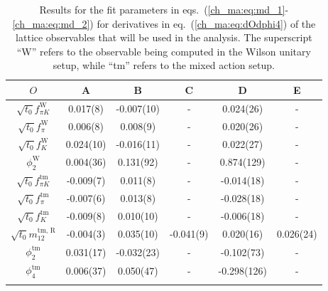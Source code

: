 \begin{longtable}{c | c c c c c}
\label{ch_ma:tab:md}
    ${O}$ & A & B & C & D & E \\
    \toprule
    $\sqrt{t_0}f_{\pi K}^{\textrm{W}}$ & 0.017(8) & -0.007(10) & - & 0.024(26) & - \\ 
    $\sqrt{t_0}f_{\pi}^{\textrm{W}}$ & 0.006(8) & 0.008(9) & - & 0.020(26) & - \\ 
    $\sqrt{t_0}f_{K}^{\textrm{W}}$ & 0.024(10) & -0.016(11) & - & 0.022(27) & - \\ 
    $\phi_2^{\textrm{W}}$ & 0.004(36) & 0.131(92) & - & 0.874(129) & - \\ 
    \midrule
    $\sqrt{t_0}f_{\pi K}^{\textrm{tm}}$ & -0.009(7) & 0.011(8) & - & -0.014(18) & - \\ 
    $\sqrt{t_0}f_{\pi}^{\textrm{tm}}$ & -0.007(6) & 0.013(8) & - & -0.028(18) & - \\ 
    $\sqrt{t_0}f_{K}^{\textrm{tm}}$ & -0.009(8) & 0.010(10) & - & -0.006(18) & - \\ 
    $\sqrt{t_0}m_{12}^{\textrm{tm, R}}$ & -0.004(3) & 0.035(10) & -0.041(9) & 0.020(16) & 0.026(24) \\ 
    $\phi_2^{\textrm{tm}}$ & 0.031(17) & -0.032(23) & - & -0.102(73) & - \\ 
    $\phi_4^{\textrm{tm}}$ & 0.006(37) & 0.050(47) & - & -0.298(126) & - \\ 
    \bottomrule
    \caption{Results for the fit parameters in eqs.~(\ref{ch_ma:eq:md_1}-\ref{ch_ma:eq:md_2}) for derivatives in eq.~(\ref{ch_ma:eq:dOdphi4}) of the lattice observables that will be used in the analysis. The superscript ``W'' refers to the observable being computed in the Wilson unitary setup, while ``tm'' refers to the mixed action setup.}
\end{longtable}


